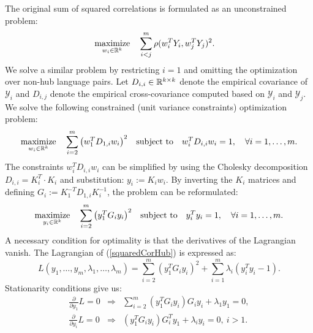 The original sum of squared correlations is formulated as an unconstrained problem:
\begin{equation*}
  \begin{aligned}
    & \underset{w_i \in \mathbb{R}^{k}}{\text{maximize}}
    & & \sum_{i < j}^m  \rho(w_i^T Y_i, w_j^T Y_j)^2.
\end{aligned}
\end{equation*}
We solve a similar problem by restricting $i=1$ and omitting the optimization over non-hub
language pairs. Let $D_{i,i} \in \mathbb{R}^{k \times k}$ denote the empirical covariance of
$\mathcal{Y}_i$ and $D_{i,j}$ denote the empirical cross-covariance computed based on
$\mathcal{Y}_i$ and $\mathcal{Y}_j$. We solve the following constrained (unit variance
constraints) optimization problem:
\begin{equation}\label{squaredCorHubOriginal}
  \begin{aligned}
    & \underset{w_i \in \mathbb{R}^{k}}{\text{maximize}}
    & & \sum_{i = 2}^m  \left(w_1^T D_{1,i} w_i \right)^2
    & \text{subject to}
    & & w_i^T D_{i,i} w_i = 1, \quad\forall i = 1,\ldots, m.
\end{aligned}
\end{equation}
The constraints $w_i^T D_{i,i} w_i$ can be simplified by using the Cholesky decomposition
$D_{i,i} = K_i^T \cdot K_i$ and substitution: $y_i := K_i w_i$. By inverting the $K_i$
matrices and defining  $G_i := K_1^{-T} D_{1,i} K_i^{-1}$, the problem can be reformulated:
\begin{equation}\label{squaredCorHub}
  \begin{aligned}
    & \underset{y_i \in \mathbb{R}^{k}}{\text{maximize}}
    & & \sum_{i = 2}^m  \left(y_1^T G_{i} y_i \right)^2
    & \text{subject to}
    & & y_i^T y_i = 1, \quad\forall i = 1,\ldots, m.
\end{aligned}
\end{equation}
A necessary condition for optimality is that the derivatives of the Lagrangian vanish.
The Lagrangian of (\ref{squaredCorHub}) is expressed as:
$$  L(y_1, \ldots, y_m, \lambda_1, \ldots, \lambda_m) =
\sum_{i = 2}^m  \left(y_1^T G_{i} y_i \right)^2 + \sum_{i=1}^m \lambda_i \left(y_i^T y_i - 1\right).$$
Stationarity conditions give us:
\begin{eqnarray}
 \label{dLdx1}  \frac{\partial}{\partial y_1} L = 0 & \Rightarrow & \sum_{i = 2}^m  \left(y_1^T G_{i} y_i \right) G_i y_i + \lambda_1 y_1 = 0, \\
 \label{dLdxi} \frac{\partial}{\partial y_i} L = 0 & \Rightarrow & \left(y_1^T G_{i} y_i \right) G_{i}^T y_1 + \lambda_i y_i = 0,~i > 1.
\end{eqnarray} 
